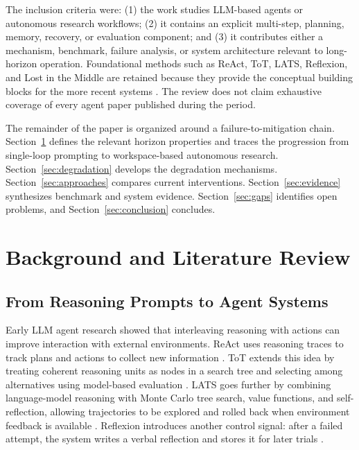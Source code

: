 \documentclass[manuscript,screen]{acmart}
\begin{document}
The inclusion criteria were: (1) the work studies LLM-based agents or autonomous research workflows; (2) it contains an explicit multi-step, planning, memory, recovery, or evaluation component; and (3) it contributes either a mechanism, benchmark, failure analysis, or system architecture relevant to long-horizon operation. Foundational methods such as ReAct, ToT, LATS, Reflexion, and Lost in the Middle are retained because they provide the conceptual building blocks for the more recent systems \cite{yao2023react,yao2023tot,zhou2023lats,shinn2023reflexion,liu2023lostmiddle}. The review does not claim exhaustive coverage of every agent paper published during the period.

The remainder of the paper is organized around a failure-to-mitigation chain. Section~\ref{sec:background} defines the relevant horizon properties and traces the progression from single-loop prompting to workspace-based autonomous research. Section~\ref{sec:degradation} develops the degradation mechanisms. Section~\ref{sec:approaches} compares current interventions. Section~\ref{sec:evidence} synthesizes benchmark and system evidence. Section~\ref{sec:gaps} identifies open problems, and Section~\ref{sec:conclusion} concludes.

\section{Background and Literature Review}\label{sec:background}

\subsection{From Reasoning Prompts to Agent Systems}
Early LLM agent research showed that interleaving reasoning with actions can improve interaction with external environments. ReAct uses reasoning traces to track plans and actions to collect new information \cite{yao2023react}. ToT extends this idea by treating coherent reasoning units as nodes in a search tree and selecting among alternatives using model-based evaluation \cite{yao2023tot}. LATS goes further by combining language-model reasoning with Monte Carlo tree search, value functions, and self-reflection, allowing trajectories to be explored and rolled back when environment feedback is available \cite{zhou2023lats}. Reflexion introduces another control signal: after a failed attempt, the system writes a verbal reflection and stores it for later trials \cite{shinn2023reflexion}.
\end{document}

